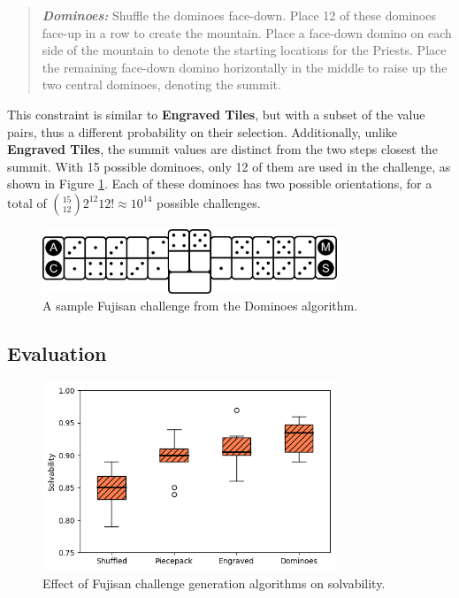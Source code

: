 \documentclass[journal]{IEEEtran}
\begin{document}
\begin{quote}
    
  {\it \bf Dominoes:} Shuffle the dominoes face-down. Place 12 of these dominoes face-up in a row to create the mountain. Place a face-down domino on each side of the mountain to denote the starting locations for the Priests. Place the remaining face-down domino horizontally in the middle to raise up the two central dominoes, denoting the summit.
\end{quote}

This constraint is similar to \textbf{Engraved Tiles}, but with a subset of the value pairs, thus a different probability on their selection.  Additionally, unlike \textbf{Engraved Tiles}, the summit values are distinct from the two steps closest the summit.
With 15 possible dominoes, only 12 of them are used in the challenge, as shown in Figure \ref{fig:dominoexample}. Each of these dominoes has two possible orientations, for a total of ${15 \choose 12}2^{12}12! \approx 10^{14}$ possible challenges. 

\begin{figure}[b]
\includegraphics[width=8.8cm]{figure15.png}
\caption{A sample Fujisan challenge from the Dominoes algorithm.}
\label{fig:dominoexample}
\end{figure}

\subsection{Evaluation}

 \noindent
%


\begin{figure}[t]
\includegraphics[width=8.8cm]{figure16.png}
\caption{Effect of Fujisan challenge generation algorithms on solvability.}
\label{fig:strategycomp}
\end{figure}
\end{document}
